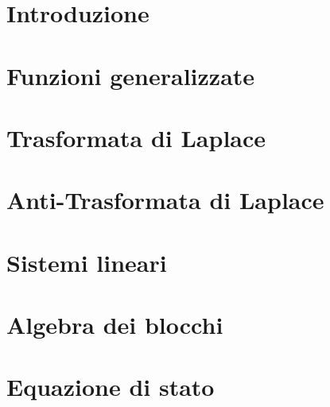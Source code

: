 \documentclass{report}
\begin{document}
	\dominitoc %
	\evenpagechapter %
	
	
	
	\titleTdS
	\pagebreak
	\pagebreak
	\tableofcontents
	\pagebreak
	\listofexercises
	\pagebreak
	\chapter{Introduzione}
	\minitoc %
	\pagebreak
		
	\pagebreak
	\chapter{Funzioni generalizzate}
	\minitoc %
	\pagebreak
	
	\pagebreak
	\chapter{Trasformata di Laplace}
	\minitoc %
	\pagebreak
	
	\pagebreak
	\chapter{Anti-Trasformata di Laplace}
	\minitoc %
	\pagebreak
	
	\pagebreak
	\chapter{Sistemi lineari}
	\minitoc %
	\pagebreak
	
	
	
	
	
	\pagebreak
	\chapter{Algebra dei blocchi}
	\minitoc %
	\pagebreak
	
	
	\pagebreak
	\chapter{Equazione di stato}
	\minitoc %
	\pagebreak
	
	\pagebreak
\end{document}

